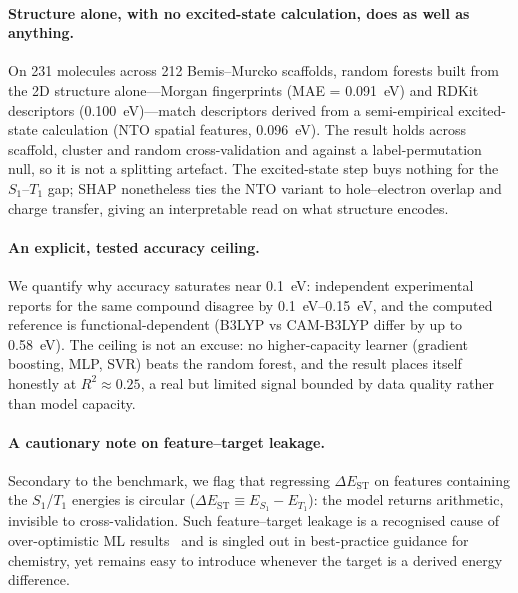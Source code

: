 \paragraph{Structure alone, with no excited-state calculation, does as well as anything.}
On \num{231} molecules across \num{212} Bemis--Murcko scaffolds, random forests built
from the 2D structure alone---Morgan fingerprints (MAE = \qty{0.091}{\electronvolt}) and
RDKit descriptors (\qty{0.100}{\electronvolt})---match descriptors derived from a
semi-empirical excited-state calculation (NTO spatial features,
\qty{0.096}{\electronvolt}). The result holds across scaffold, cluster and random
cross-validation and against a label-permutation null, so it is not a splitting
artefact. The excited-state step buys nothing for the $S_1$--$T_1$ gap; SHAP nonetheless
ties the NTO variant to hole--electron overlap and charge transfer, giving an
interpretable read on what structure encodes.

\paragraph{An explicit, tested accuracy ceiling.}
We quantify why accuracy saturates near \qty{0.1}{\electronvolt}: independent
experimental reports for the same compound disagree by
\qtyrange{0.1}{0.15}{\electronvolt}, and the computed reference is
functional-dependent (B3LYP vs CAM-B3LYP differ by up to
\qty{0.58}{\electronvolt}). The ceiling is not an excuse: no higher-capacity learner
(gradient boosting, MLP, SVR) beats the random forest, and the result places itself
honestly at $R^2 \approx 0.25$, a real but limited signal bounded by data quality
rather than model capacity.

\paragraph{A cautionary note on feature--target leakage.}
Secondary to the benchmark, we flag that regressing $\Delta E_\text{ST}$ on features
containing the $S_1$/$T_1$ energies is circular ($\Delta E_\text{ST} \equiv E_{S_1} -
E_{T_1}$): the model returns arithmetic, invisible to cross-validation. Such
feature--target leakage is a recognised cause of over-optimistic ML results~\cite{Kapoor2023}
and is singled out in best-practice guidance for chemistry,\cite{Artrith2021} yet remains
easy to introduce whenever the target is a derived energy difference.

